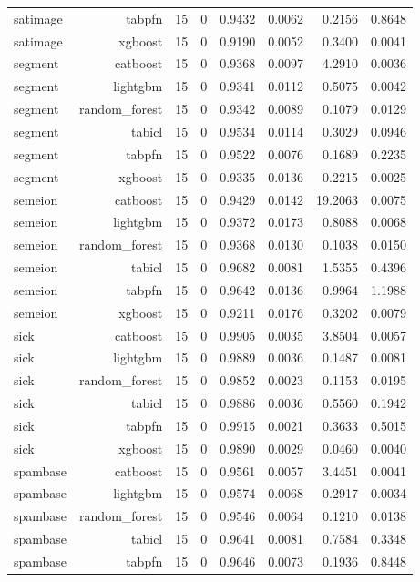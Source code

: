 \begin{table}[htbp]
\begin{tabular}{lrrrrrrr}
satimage & tabpfn & 15 & 0 & 0.9432 & 0.0062 & 0.2156 & 0.8648 \\
satimage & xgboost & 15 & 0 & 0.9190 & 0.0052 & 0.3400 & 0.0041 \\
segment & catboost & 15 & 0 & 0.9368 & 0.0097 & 4.2910 & 0.0036 \\
segment & lightgbm & 15 & 0 & 0.9341 & 0.0112 & 0.5075 & 0.0042 \\
segment & random\_forest & 15 & 0 & 0.9342 & 0.0089 & 0.1079 & 0.0129 \\
segment & tabicl & 15 & 0 & 0.9534 & 0.0114 & 0.3029 & 0.0946 \\
segment & tabpfn & 15 & 0 & 0.9522 & 0.0076 & 0.1689 & 0.2235 \\
segment & xgboost & 15 & 0 & 0.9335 & 0.0136 & 0.2215 & 0.0025 \\
semeion & catboost & 15 & 0 & 0.9429 & 0.0142 & 19.2063 & 0.0075 \\
semeion & lightgbm & 15 & 0 & 0.9372 & 0.0173 & 0.8088 & 0.0068 \\
semeion & random\_forest & 15 & 0 & 0.9368 & 0.0130 & 0.1038 & 0.0150 \\
semeion & tabicl & 15 & 0 & 0.9682 & 0.0081 & 1.5355 & 0.4396 \\
semeion & tabpfn & 15 & 0 & 0.9642 & 0.0136 & 0.9964 & 1.1988 \\
semeion & xgboost & 15 & 0 & 0.9211 & 0.0176 & 0.3202 & 0.0079 \\
sick & catboost & 15 & 0 & 0.9905 & 0.0035 & 3.8504 & 0.0057 \\
sick & lightgbm & 15 & 0 & 0.9889 & 0.0036 & 0.1487 & 0.0081 \\
sick & random\_forest & 15 & 0 & 0.9852 & 0.0023 & 0.1153 & 0.0195 \\
sick & tabicl & 15 & 0 & 0.9886 & 0.0036 & 0.5560 & 0.1942 \\
sick & tabpfn & 15 & 0 & 0.9915 & 0.0021 & 0.3633 & 0.5015 \\
sick & xgboost & 15 & 0 & 0.9890 & 0.0029 & 0.0460 & 0.0040 \\
spambase & catboost & 15 & 0 & 0.9561 & 0.0057 & 3.4451 & 0.0041 \\
spambase & lightgbm & 15 & 0 & 0.9574 & 0.0068 & 0.2917 & 0.0034 \\
spambase & random\_forest & 15 & 0 & 0.9546 & 0.0064 & 0.1210 & 0.0138 \\
spambase & tabicl & 15 & 0 & 0.9641 & 0.0081 & 0.7584 & 0.3348 \\
spambase & tabpfn & 15 & 0 & 0.9646 & 0.0073 & 0.1936 & 0.8448 \\

\end{tabular}
\end{table}

